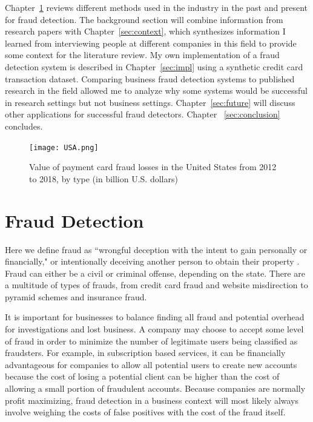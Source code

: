 \documentclass[midd]{thesis}
\begin{document}
Chapter~\ref{sec:background} reviews different methods used in the industry in the past and present for fraud detection. The background section will combine information from research papers with Chapter~\ref{sec:context}, which synthesizes information I learned from interviewing people at different companies in this field to provide some context for the literature review. My own implementation of a fraud detection system is described in Chapter~\ref{sec:impl} using a synthetic credit card transaction dataset. Comparing business fraud detection systems to published research in the field allowed me to analyze why some systems would be successful in research settings but not business settings. Chapter~\ref{sec:future} will discuss other applications for successful fraud detectors. Chapter ~\ref{sec:conclusion} concludes.

\begin{figure}
  \texttt{[image: USA.png]}
  \caption[Fraud Losses in U.S.]{Value of payment card fraud losses in the United States from 2012 to 2018, by type (in billion U.S. dollars) \cite{USA}}
  \label{fig:USA}
\end{figure}


\pagebreak

\chapter{Fraud Detection}
\label{sec:background}

Here we define fraud as ``wrongful deception with the intent to gain personally or financially," or intentionally deceiving another person to obtain their property \cite{legaldict}. Fraud can either be a civil or criminal offense, depending on the state. There are a multitude of types of frauds, from credit card fraud and website misdirection to pyramid schemes and insurance fraud. 

It is important for businesses to balance finding all fraud and potential overhead for investigations and lost business. A company may choose to accept some level of fraud in order to minimize the number of legitimate users being classified as fraudsters. For example, in subscription based services, it can be financially advantageous for companies to allow all potential users to create new accounts because the cost of losing a potential client can be higher than the cost of allowing a small portion of fraudulent accounts. Because companies are normally profit maximizing, fraud detection in a business context will most likely always involve weighing the costs of false positives with the cost of the fraud itself.
\end{document}
